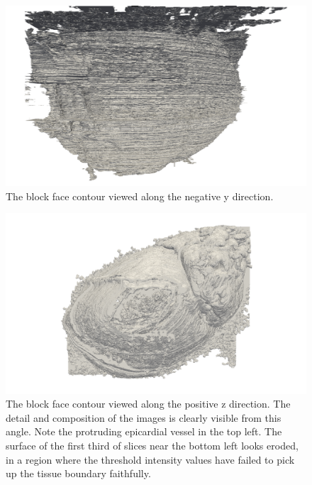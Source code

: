     \begin{figure}
      \centering
      \includegraphics[width=\textheight]{Ch6/Figs/Rat28/contours/LoRes_negative_y}
      \caption{The block face contour viewed along the negative y direction.}
      \label{fig:LoRes_negative_y}
    \end{figure}
    
    \begin{figure}
      \centering
      \includegraphics[width=\textheight]{Ch6/Figs/Rat28/contours/LoRes_positive_z}
      \caption{The block face contour viewed along the positive z direction. The detail and composition of the images is clearly visible from this angle. Note the protruding epicardial vessel in the top left. The surface of the first third of slices near the bottom left looks eroded, in a region where the threshold intensity values have failed to pick up the tissue boundary faithfully.}
      \label{fig:LoRes_positive_z}
    \end{figure}
    
